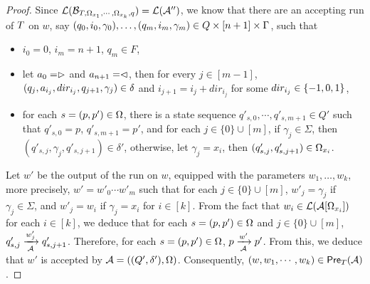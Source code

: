 \begin{proof}
Since $\mathcal{L}(\mathcal{B}_{T, \Omega_{x_1}, \cdots, \Omega_{x_k}, q})=\mathcal{L}(\mathcal{A}'')$, we know that  there are an accepting run of $T$ on $w$, 
say $(q_0, i_0, \gamma_0),\ldots, (q_m, i_m, \gamma_m) \in Q \times [n+1] \times \Gamma$, such that 
\begin{itemize}
\item $i_0=0$, $i_m = n+1$, $q_m \in F$, 
%
\item let $a_0 = \vartriangleright$ and $a_{n+1} = \vartriangleleft$,  then for every $j \in [m-1]$, $(q_j, a_{i_j}, dir_{i_j}, q_{j+1}, \gamma_j) \in
        \delta$ and $i_{j+1} = i_j + dir_{i_j}$ for some $dir_{i_j} \in \{-1, 0, 1\}$, 
 \item  for each $s=(p, p') \in \Omega$, there is a state sequence $q'_{s, 0}, \cdots, q'_{s,m+1} \in Q'$ such that $q'_{s,0}= p$, $q'_{s, m+1} = p'$, and 
 for each $j \in \{0\} \cup [m]$, if $\gamma_j \in \Sigma$, then $(q'_{s, j}, \gamma_j, q'_{s, j+1}) \in \delta'$, otherwise, let $\gamma_j =x_i$, then $(q'_{s, j}, q'_{s, j+1}) \in \Omega_{x_i}$.  
\end{itemize}
Let $w'$ be the output of the run on $w$, equipped with the parameters $w_1,\ldots, w_k$, more precisely, $w' = w'_0 \cdots w'_m$ such that for each $j \in \{0\} \cup [m]$, $w'_j = \gamma_j$ if $\gamma_j \in \Sigma$, and $w'_j = w_i$ if $\gamma_j = x_i$ for $i \in [k]$. From the fact that $w_i \in \mathcal{L}(\mathcal{A}[\Omega_{x_i}])$ for each $i \in [k]$, we deduce that for each $s = (p,p') \in \Omega$ and $j \in \{0\} \cup [m]$, $q'_{s, j} \xrightarrow[\mathcal{A}]{w'_j} q'_{s, j+1}$.
Therefore, for each $s = (p,p') \in \Omega$, $p \xrightarrow[\mathcal{A}]{w'} p'$. From this, we deduce that $w'$ is accepted by $\mathcal{A}=((Q', \delta'), \Omega)$.
Consequently, $(w, w_1,\cdots, w_k) \in \textsf{Pre}_{T}(\mathcal{A})$.
\end{proof}





